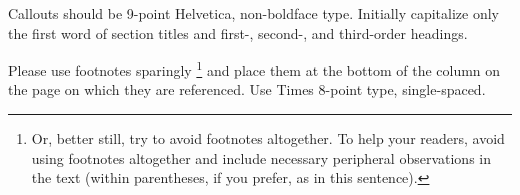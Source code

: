 \documentclass[times, 10pt,twocolumn]{article}
\begin{document}
\noindent Callouts should be 9-point Helvetica, non-boldface type.
Initially capitalize only the first word of section titles and first-,
second-, and third-order headings.


Please use footnotes sparingly%
\footnote
   {%
     Or, better still, try to avoid footnotes altogether.  To help your
     readers, avoid using footnotes altogether and include necessary
     peripheral observations in the text (within parentheses, if you
     prefer, as in this sentence).
   }
and place them at the bottom of the column on the page on which they are
referenced. Use Times 8-point type, single-spaced.


\nocite{ex1,ex2}


\end{document}
